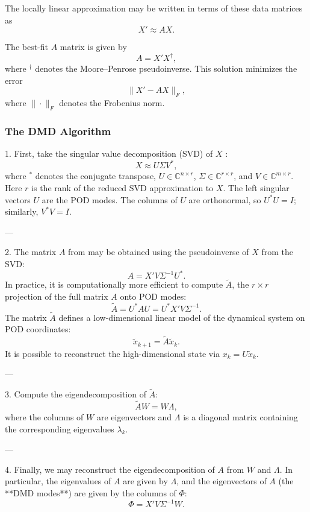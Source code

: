 \documentclass{article}
\begin{document}
The locally linear approximation may be written in terms of these data matrices as
\[
X' \approx A X.
\]

The best-fit $A$ matrix is given by
\[
A = X' X^{\dagger},
\]
where ${}^\dagger$ denotes the Moore--Penrose pseudoinverse. This solution minimizes the error
\[
\| X' - A X \|_F,
\]
where $\|\cdot\|_F$ denotes the Frobenius norm.

\vspace{1cm}

\subsubsection*{The DMD Algorithm}

\vspace{1cm}

1. First, take the singular value decomposition (SVD) of $X$ :
\[
X \approx U \Sigma V^*,
\]
where ${}^*$ denotes the conjugate transpose, 
$U \in \mathbb{C}^{n \times r}$, 
$\Sigma \in \mathbb{C}^{r \times r}$, 
and $V \in \mathbb{C}^{m \times r}$.  
Here $r$ is the rank of the reduced SVD approximation to $X$.  
The left singular vectors $U$ are the POD modes.  
The columns of $U$ are orthonormal, so $U^* U = I$; similarly, $V^* V = I$.

---

2. The matrix $A$ from may be obtained using the pseudoinverse of $X$ from the SVD:
\[
A = X' V \Sigma^{-1} U^*.
\]
In practice, it is computationally more efficient to compute $\tilde{A}$, the $r \times r$ 
projection of the full matrix $A$ onto POD modes:
\[
\tilde{A} = U^* A U = U^* X' V \Sigma^{-1}.
\]
The matrix $\tilde{A}$ defines a low-dimensional linear model of the dynamical system 
on POD coordinates:
\[
\tilde{x}_{k+1} = \tilde{A} \tilde{x}_k.
\]
It is possible to reconstruct the high-dimensional state via $x_k = U \tilde{x}_k$.

---

3. Compute the eigendecomposition of $\tilde{A}$:
\[
\tilde{A} W = W \Lambda,
\]
where the columns of $W$ are eigenvectors and $\Lambda$ is a diagonal matrix 
containing the corresponding eigenvalues $\lambda_k$.

---

4. Finally, we may reconstruct the eigendecomposition of $A$ from $W$ and $\Lambda$.  
In particular, the eigenvalues of $A$ are given by $\Lambda$, and the eigenvectors of $A$ 
(the **DMD modes**) are given by the columns of $\Phi$:
\[
\Phi = X' V \Sigma^{-1} W.
\]
\end{document}
